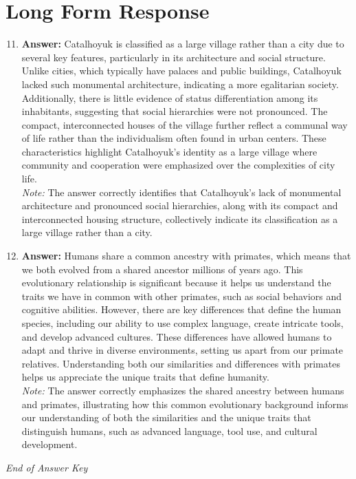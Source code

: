 \documentclass[12pt]{article}
\begin{document}
\section*{Long Form Response}
\begin{enumerate}[label=\arabic*.]
\setcounter{enumi}{10}
\item \textbf{Answer:} Catalhoyuk is classified as a large village rather than a city due to several key features, particularly in its architecture and social structure. Unlike cities, which typically have palaces and public buildings, Catalhoyuk lacked such monumental architecture, indicating a more egalitarian society. Additionally, there is little evidence of status differentiation among its inhabitants, suggesting that social hierarchies were not pronounced. The compact, interconnected houses of the village further reflect a communal way of life rather than the individualism often found in urban centers. These characteristics highlight Catalhoyuk's identity as a large village where community and cooperation were emphasized over the complexities of city life.
\\ \textit{Note:} The answer correctly identifies that Catalhoyuk's lack of monumental architecture and pronounced social hierarchies, along with its compact and interconnected housing structure, collectively indicate its classification as a large village rather than a city.
\item \textbf{Answer:} Humans share a common ancestry with primates, which means that we both evolved from a shared ancestor millions of years ago. This evolutionary relationship is significant because it helps us understand the traits we have in common with other primates, such as social behaviors and cognitive abilities. However, there are key differences that define the human species, including our ability to use complex language, create intricate tools, and develop advanced cultures. These differences have allowed humans to adapt and thrive in diverse environments, setting us apart from our primate relatives. Understanding both our similarities and differences with primates helps us appreciate the unique traits that define humanity.
\\ \textit{Note:} The answer correctly emphasizes the shared ancestry between humans and primates, illustrating how this common evolutionary background informs our understanding of both the similarities and the unique traits that distinguish humans, such as advanced language, tool use, and cultural development.
\end{enumerate}

\vfill
\noindent\textit{End of Answer Key}
\end{document}
